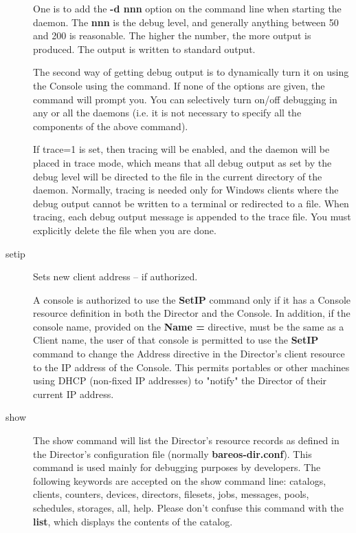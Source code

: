 \begin{description}
    One is to add the
   {\bf -d nnn} option on the command line when starting the daemon. 
   The {\bf nnn} is the debug level, and generally anything between 50 and 200 is
   reasonable. The higher the number, the more output is produced. The output is
   written to standard output.

   The second way of getting debug output is to dynamically turn it on using the
   Console using the  command.
   If none of the options are given, the command will prompt you. You can
   selectively turn on/off debugging in any or all the daemons (i.e. it is not
   necessary to specify all the components of the above command).

   If trace=1 is set, then tracing will be enabled, and the daemon will be
   placed in trace mode, which means that all debug output as set by the
   debug level will be directed to the file  in the
   current directory of the daemon.  Normally, tracing is needed only for
   Windows clients where the debug output cannot be written to a terminal or
   redirected to a file.  When tracing, each debug output message is
   appended to the trace file.  You must explicitly delete the file when
   you are done.

\item [setip]
   Sets new client address -- if authorized.

   A console is authorized to use the {\bf SetIP} command only if it has a
   Console resource definition in both the Director and the Console.  In
   addition, if the console name, provided on the {\bf Name =} directive,
   must be the same as a Client name, the user of that console is permitted
   to use the {\bf SetIP} command to change the Address directive in the
   Director's client resource to the IP address of the Console.  This
   permits portables or other machines using DHCP (non-fixed IP addresses)
   to "notify" the Director of their current IP address.

\item [show]
   The show command will list the Director's resource records as defined in
   the Director's configuration file (normally {\bf bareos-dir.conf}).
   This command is used mainly for debugging purposes by developers.
   The following keywords are accepted on the
   show command line: catalogs, clients, counters, devices, directors,
   filesets, jobs, messages, pools, schedules, storages, all, help.
   Please don't confuse this command
   with the {\bf list}, which displays the contents of the catalog.


\end{description}
